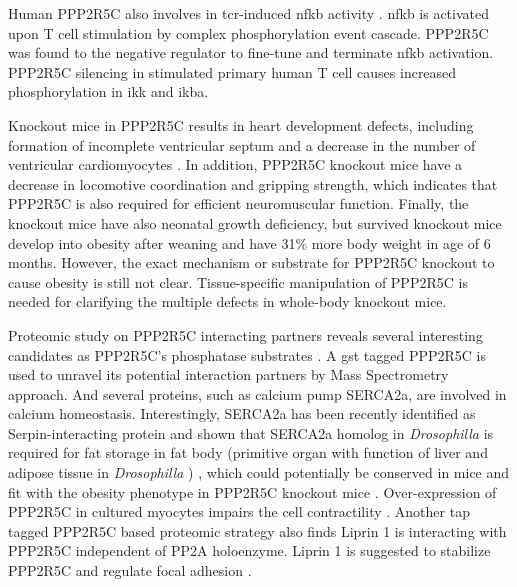 Human PPP2R5C also involves in \gls{tcr}-induced \gls{nfkb} activity \cite{breuer_protein_2014}. \gls{nfkb} is activated upon T cell stimulation by complex phosphorylation event cascade. PPP2R5C was found to the negative regulator to fine-tune and terminate \gls{nfkb} activation. PPP2R5C silencing in stimulated primary human T cell causes increased phosphorylation in \gls{ikk} and \gls{ikba}. 

Knockout mice in PPP2R5C results in heart development defects, including formation of incomplete ventricular septum and a decrease in the number of ventricular cardiomyocytes \cite{varadkar_protein_2014}. In addition, PPP2R5C knockout mice have a decrease in locomotive coordination and gripping strength, which indicates that PPP2R5C is also required for efficient neuromuscular function. Finally, the knockout mice have also neonatal growth deficiency, but survived knockout mice develop into obesity after weaning and have 31\% more body weight in age of 6 months. However, the exact mechanism or substrate for PPP2R5C knockout to cause obesity is still not clear. Tissue-specific manipulation of PPP2R5C is needed for clarifying the multiple defects in whole-body knockout mice. 

Proteomic study on PPP2R5C interacting partners reveals several interesting candidates as PPP2R5C's phosphatase substrates \cite{arroyo_liprin_2008,zhou_proteomic_2007}. A \gls{gst} tagged PPP2R5C is used to unravel its potential interaction partners by Mass Spectrometry approach. And several proteins, such as calcium pump SERCA2a, are involved in calcium homeostasis. Interestingly, SERCA2a has been recently identified as Serpin-interacting protein and shown that SERCA2a homolog in \textit{Drosophilla} is required for fat storage in fat body (primitive organ with function of liver and adipose tissue in \textit{Drosophilla} \cite{hietakangas_regulation_2009}) \cite{bi_seipin_2014}, which could potentially be conserved in mice and fit with the obesity phenotype in PPP2R5C knockout mice \cite{varadkar_protein_2014}. Over-expression of PPP2R5C in cultured myocytes impairs the cell contractility \cite{zhou_proteomic_2007}. Another \gls{tap} tagged PPP2R5C based proteomic strategy also finds Liprin \textalpha{}1 is interacting with PPP2R5C independent of PP2A holoenzyme. Liprin \textalpha{}1 is suggested to stabilize PPP2R5C and regulate focal adhesion \cite{arroyo_liprin_2008}. 

